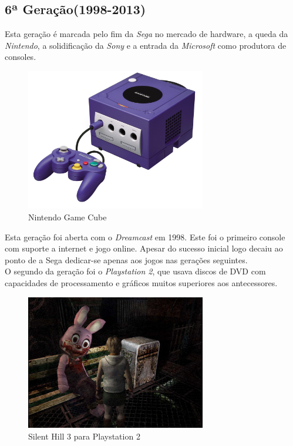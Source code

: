 \documentclass[paper=a4, fontsize=11pt]{scrartcl}	%
\numberwithin{equation}{section}															%
\numberwithin{figure}{section}																%
\numberwithin{table}{section}																%
\begin{document}
\subsection{6ª Geração(1998-2013)}
Esta geração é marcada pelo fim da \textit{Sega} no mercado de hardware, a queda da \textit{Nintendo}, a solidificação da \textit{Sony} e a entrada da \textit{Microsoft} como produtora de consoles.\\
\begin{figure}[h!]
	\centering
    \includegraphics[width=0.7\textwidth]{img/gamecube}
    \caption{Nintendo Game Cube}
\end{figure}
Esta geração foi aberta com o \textit{Dreamcast} em 1998. Este foi o primeiro console com suporte a internet e jogo online. Apesar do sucesso inicial logo decaiu ao ponto de a Sega dedicar-se apenas aos jogos nas gerações seguintes.\\
O segundo da geração foi o \textit{Playstation 2}, que usava discos de DVD com capacidades de processamento e gráficos muitos superiores aos antecessores.\\
\begin{figure}[h!]
	\centering
    \includegraphics[width=0.7\textwidth]{img/sh3}
    \caption{Silent Hill 3 para Playstation 2}
\end{figure}
\end{document}
